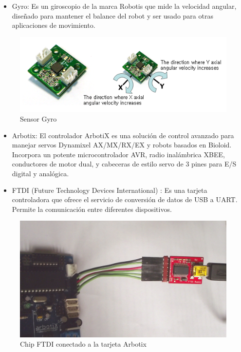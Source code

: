 \begin{itemize}
\item Gyro: Es un giroscopio de la marca Robotis que mide la velocidad angular, diseñado para mantener el balance del robot y ser usado para otras aplicaciones de movimiento. 

\end{itemize}

\begin{figure}[hbtp]
\caption{Sensor Gyro }
\centering
\includegraphics[scale=0.5]{imagenes/gyro.png}
\end{figure}

\begin{itemize}
\item Arbotix: El controlador ArbotiX es una solución de control avanzado para manejar servos Dynamixel AX/MX/RX/EX y robots basados en Bioloid. Incorpora un potente microcontrolador AVR, radio inalámbrica XBEE, conductores de motor dual, y cabeceras de estilo servo de 3 pines para E/S digital y analógica.\cite{arbotix}

\end{itemize}


\begin{itemize}
\item FTDI (Future Technology Devices International) : Es una tarjeta controladora que ofrece el servicio de conversión de datos de USB a UART. Permite la comunicación entre diferentes dispositivos. 


\end{itemize}
\begin{figure}[hbtp]
\caption{Chip FTDI conectado a la tarjeta Arbotix }
\centering
\includegraphics[scale=0.09]{imagenes/DSCF1162.jpg}
\end{figure}



